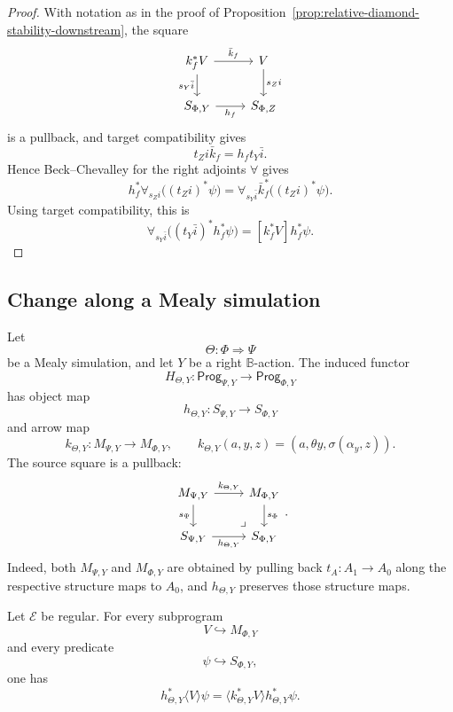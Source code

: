 \begin{proof}
With notation as in the proof of
Proposition~\ref{prop:relative-diamond-stability-downstream}, the square
\[
\begin{tikzcd}
k_f^\ast V \arrow[r,"\bar k_f"] \arrow[d,"s_Y\bar i"']
&
V \arrow[d,"s_Z i"]
\\
S_{\Phi,Y} \arrow[r,"h_f"']
&
S_{\Phi,Z}
\end{tikzcd}
\]
is a pullback, and target compatibility gives
\[
t_Z i\bar k_f=h_f t_Y\bar i.
\]
Hence Beck--Chevalley for the right adjoints \(\forall\) gives
\[
h_f^\ast\forall_{s_Z i}\bigl((t_Z i)^\ast\psi\bigr)
=
\forall_{s_Y\bar i}\bar k_f^\ast\bigl((t_Z i)^\ast\psi\bigr).
\]
Using target compatibility, this is
\[
\forall_{s_Y\bar i}\bigl((t_Y\bar i)^\ast h_f^\ast\psi\bigr)
=
[k_f^\ast V]h_f^\ast\psi.
\]
\end{proof}

\subsection{Change along a Mealy simulation}
\label{subsec:relative-modal-stability-simulation}

Let
\[
\Theta:\Phi\Rightarrow\Psi
\]
be a Mealy simulation, and let \(Y\) be a right \(\mathbb B\)-action. The
induced functor
\[
H_{\Theta,Y}:\mathsf{Prog}_{\Psi,Y}\to\mathsf{Prog}_{\Phi,Y}
\]
has object map
\[
h_{\Theta,Y}:S_{\Psi,Y}\to S_{\Phi,Y}
\]
and arrow map
\[
k_{\Theta,Y}:M_{\Psi,Y}\to M_{\Phi,Y},
\qquad
k_{\Theta,Y}(a,y,z)=
(a,\theta y,\sigma(\alpha_y,z)).
\]
The source square is a pullback:
\[
\begin{tikzcd}
M_{\Psi,Y} \arrow[r,"k_{\Theta,Y}"] \arrow[d,"s_\Psi"']
&
M_{\Phi,Y} \arrow[d,"s_\Phi"]
\\
S_{\Psi,Y} \arrow[r,"h_{\Theta,Y}"']
&
S_{\Phi,Y}
\arrow[ul,phantom,very near start,"\lrcorner"]
\end{tikzcd}
.
\]
Indeed, both \(M_{\Psi,Y}\) and \(M_{\Phi,Y}\) are obtained by pulling back
\(t_A:A_1\to A_0\) along the respective structure maps to \(A_0\), and
\(h_{\Theta,Y}\) preserves those structure maps.

\begin{proposition}
\label{prop:relative-diamond-stability-simulation}
Let \(\mathcal E\) be regular. For every subprogram
\[
V\hookrightarrow M_{\Phi,Y}
\]
and every predicate
\[
\psi\hookrightarrow S_{\Phi,Y},
\]
one has
\[
h_{\Theta,Y}^\ast\langle V\rangle\psi
=
\langle k_{\Theta,Y}^\ast V\rangle h_{\Theta,Y}^\ast\psi.
\]
\end{proposition}

